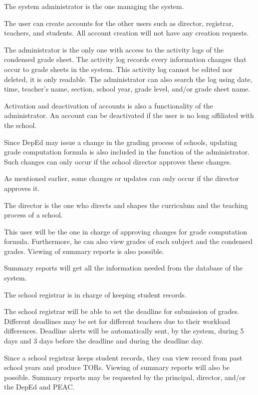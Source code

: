 \documentclass[11pt,a4paper,titlepage]{article}
\begin{document}
The system administrator is the one managing the system.

The user can create accounts for the other users such as director, registrar, teachers, and students. All account creation will not have any creation requests.

The administrator is the only one with access to the activity logs of the condensed grade sheet. The activity log records every information changes that occur to grade sheets in the system. This activity log cannot be edited nor deleted, it is only readable. The administrator can also search the log using date, time, teacher's name, section, school year, grade level, and/or grade sheet name.

Activation and deactivation of accounts is also a functionality of the administrator. An account can be deactivated if the user is no long affiliated with the school.

Since DepEd may issue a change in the grading process of schools, updating grade computation formula is also included in the function of the administrator. Such changes can only occur if the school director approves these changes.

As mentioned earlier, some changes or updates can only occur if the director approves it.

The director is the one who directs and shapes the curriculum and the teaching process of a school.

This user will be the one in charge of approving changes for grade computation formula. Furthermore, he can also view grades of each subject and the condensed grades. Viewing of summary reports is also possible.

Summary reports will get all the information needed from the database of the system.

The school registrar is in charge of keeping student records.

The school registrar will be able to set the deadline for submission of grades. Different deadlines may be set for different teachers due to their workload differences. Deadline alerts will be automatically sent, by the system, during 5 days and 3 days before the deadline and during the deadline day.

Since a school registrar keeps student records, they can view record from past school years and produce TORs. Viewing of summary reports will also be possible. Summary reports may be requested by the principal, director, and/or the DepEd and PEAC.
\end{document}
